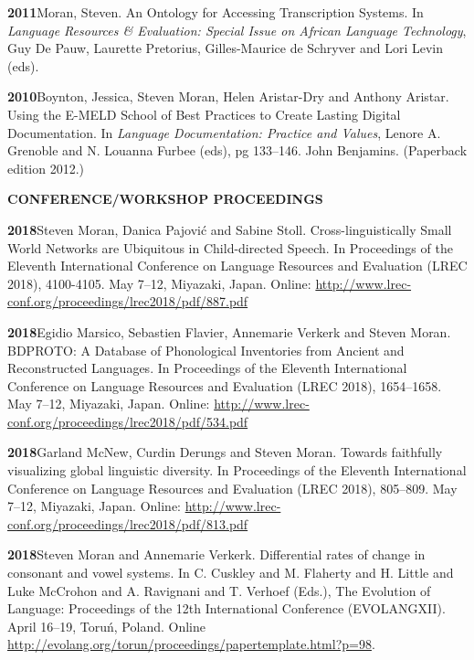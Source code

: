 \documentclass[11pt]{article}
\newcommand{\hangpara}{
 \setlength{\parindent}{0in} %
 \hangindent=0.42in %
}
\begin{document}
\vskip 6pt
\hangpara
{\bf 2011}\hspace{1ex}Moran, Steven. An Ontology for Accessing Transcription Systems. In {\it Language Resources \& Evaluation: Special Issue on African Language Technology}, Guy De Pauw, Laurette Pretorius, Gilles-Maurice de Schryver and Lori Levin (eds). %

\vskip 6pt
\hangpara
{\bf 2010}\hspace{1ex}Boynton, Jessica, Steven Moran, Helen Aristar-Dry and Anthony Aristar. Using the E-MELD School of Best Practices to Create Lasting Digital Documentation. In {\it Language Documentation: Practice and Values}, Lenore A. Grenoble and N. Louanna Furbee (eds), pg 133--146. John Benjamins. (Paperback edition 2012.)


\vskip 20pt
\begin{flushleft}
{\bf CONFERENCE/WORKSHOP PROCEEDINGS}
\end{flushleft}


\hangpara
{\bf 2018}\hspace{1ex}Steven Moran, Danica Pajovi{\'c} and Sabine Stoll. Cross-linguistically Small World Networks are Ubiquitous in Child-directed Speech. In Proceedings of the Eleventh International Conference on Language Resources and Evaluation (LREC 2018), 4100-4105. May 7--12, Miyazaki, Japan. Online: \url{http://www.lrec-conf.org/proceedings/lrec2018/pdf/887.pdf}

\vskip 6pt
\hangpara
{\bf 2018}\hspace{1ex}Egidio Marsico, Sebastien Flavier, Annemarie Verkerk and Steven Moran. BDPROTO: A Database of Phonological Inventories from Ancient and Reconstructed Languages. In Proceedings of the Eleventh International Conference on Language Resources and Evaluation (LREC 2018), 1654--1658. May 7--12, Miyazaki, Japan. Online: \url{http://www.lrec-conf.org/proceedings/lrec2018/pdf/534.pdf}

\vskip 6pt
\hangpara
{\bf 2018}\hspace{1ex}Garland McNew, Curdin Derungs and Steven Moran. Towards faithfully visualizing global linguistic diversity. In Proceedings of the Eleventh International Conference on Language Resources and Evaluation (LREC 2018), 805--809. May 7--12, Miyazaki, Japan. Online: \url{http://www.lrec-conf.org/proceedings/lrec2018/pdf/813.pdf}

\vskip 6pt
\hangpara
{\bf 2018}\hspace{1ex}Steven Moran and Annemarie Verkerk. Differential rates of change in consonant and vowel systems. In C. Cuskley and M. Flaherty and H. Little and Luke McCrohon and A. Ravignani and T. Verhoef (Eds.), The Evolution of Language: Proceedings of the 12th International Conference (EVOLANGXII). April 16--19, Toru{\'n}, Poland. Online \url{http://evolang.org/torun/proceedings/papertemplate.html?p=98}. %
\end{document}
